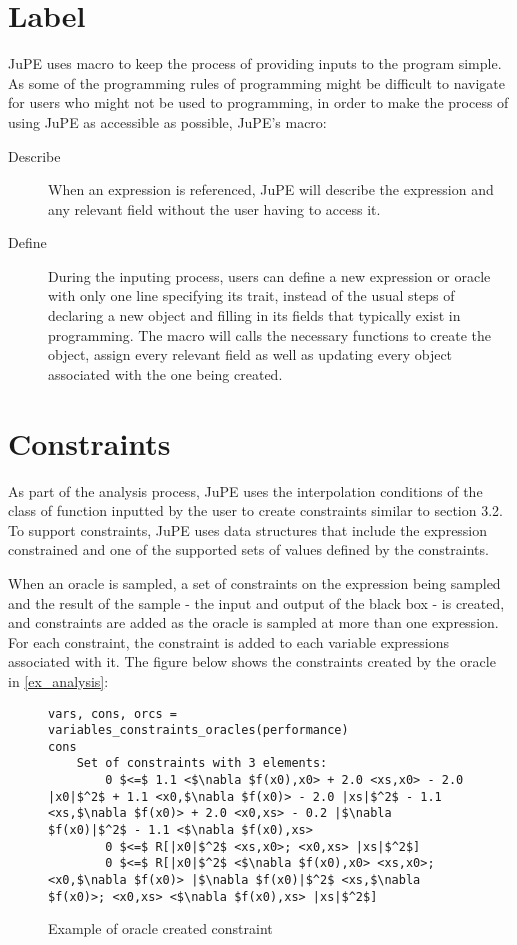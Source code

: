 
\section{Label}
JuPE uses macro to keep the process of providing inputs to the program simple. As some of the programming rules of programming might be difficult to navigate for users who might not be used to programming, in order to make the process of using JuPE as accessible as possible, JuPE's macro:
\begin{description}
	\item[Describe] When an expression is referenced, JuPE will describe the expression and any relevant field without the user having to access it.
	\item[Define] During the inputing process, users can define a new expression or oracle with only one line specifying its trait, instead of the usual steps of declaring a new object and filling in its fields that typically exist in programming. The macro will calls the necessary functions to create the object, assign every relevant field as well as updating every  object associated with the one being created.
\end{description}

\section{Constraints}
As part of the analysis process, JuPE uses the interpolation conditions of the class of function inputted by the user to create constraints similar to section 3.2. To support constraints, JuPE uses data structures that include the expression constrained and one of the supported sets of values defined by the constraints.

When an oracle is sampled, a set of constraints on the expression being sampled and the result of the sample - the input and output of the black box - is created, and constraints are added as the oracle is sampled at more than one expression. For each constraint, the constraint is added to each variable expressions associated with it. The figure below shows the constraints created by the oracle in \ref{ex_analysis}:

\begin{figure}[hbtp]
	\caption{Example of oracle created constraint}
	\label{ex_orc_constraints}
	\begin{lstlisting}[mathescape]
vars, cons, orcs = variables_constraints_oracles(performance)
cons
	Set of constraints with 3 elements:
		0 $<=$ 1.1 <$\nabla $f(x0),x0> + 2.0 <xs,x0> - 2.0 |x0|$^2$ + 1.1 <x0,$\nabla $f(x0)> - 2.0 |xs|$^2$ - 1.1 <xs,$\nabla $f(x0)> + 2.0 <x0,xs> - 0.2 |$\nabla $f(x0)|$^2$ - 1.1 <$\nabla $f(x0),xs>
		0 $<=$ R[|x0|$^2$ <xs,x0>; <x0,xs> |xs|$^2$]
		0 $<=$ R[|x0|$^2$ <$\nabla $f(x0),x0> <xs,x0>; <x0,$\nabla $f(x0)> |$\nabla $f(x0)|$^2$ <xs,$\nabla $f(x0)>; <x0,xs> <$\nabla $f(x0),xs> |xs|$^2$]
	\end{lstlisting}
\end{figure}

